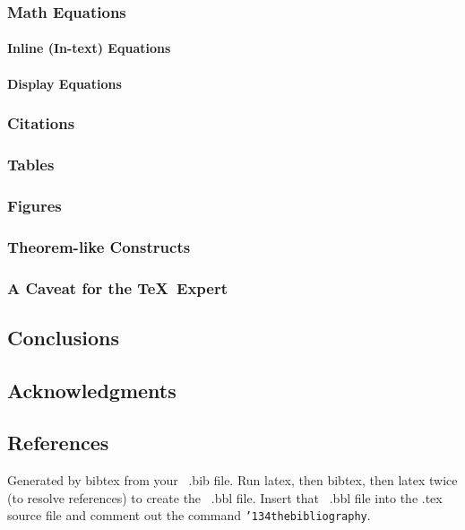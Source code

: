 \documentclass{sig-alternate}
\begin{document}
\subsubsection{Math Equations}
\paragraph{Inline (In-text) Equations}
\paragraph{Display Equations}
\subsubsection{Citations}
\subsubsection{Tables}
\subsubsection{Figures}
\subsubsection{Theorem-like Constructs}
\subsubsection*{A Caveat for the \TeX\ Expert}
\subsection{Conclusions}
\subsection{Acknowledgments}
\subsection{References}
Generated by bibtex from your ~.bib file.  Run latex,
then bibtex, then latex twice (to resolve references)
to create the ~.bbl file.  Insert that ~.bbl file into
the .tex source file and comment out
the command \texttt{{\char'134}thebibliography}.
\end{document}

